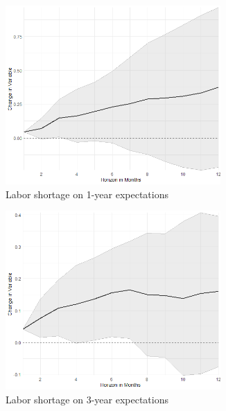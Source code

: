 \begin{figure}
	\begin{subfigure}{.24\textwidth}
		\includegraphics[width=0.9\textwidth]{output/lp/baseline/level/labor_shortage/labor_shortageonexpectations1y_djn.png}
		\caption{Labor shortage on 1-year expectations}
	\end{subfigure}
	\begin{subfigure}{.24\textwidth}
		\includegraphics[width=0.9\textwidth]{output/lp/baseline/level/labor_shortage/labor_shortageonexpectations3y_djn.png}
		\caption{Labor shortage on 3-year expectations}
	\end{subfigure}
	\begin{subfigure}{00.24\textwidth}

\end{subfigure}
\end{figure}
